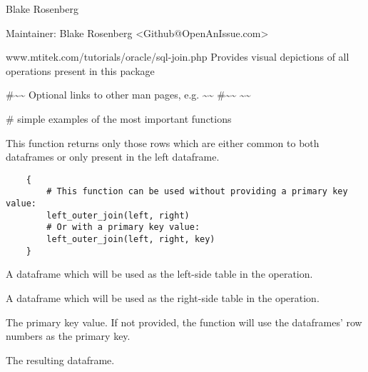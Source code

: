 \documentclass[a4paper]{book}
\begin{document}
%
\begin{Author}\relax
Blake Rosenberg

Maintainer: Blake Rosenberg <Github@OpenAnIssue.com>
\end{Author}
%
\begin{References}\relax
www.mtitek.com/tutorials/oracle/sql-join.php Provides visual depictions of all operations present in this package
\end{References}
%
\begin{SeeAlso}\relax
\#\textasciitilde{}\textasciitilde{} Optional links to other man pages, e.g. \textasciitilde{}\textasciitilde{}
\#\textasciitilde{}\textasciitilde{}  \textasciitilde{}\textasciitilde{}
\end{SeeAlso}
%
\begin{Examples}
\begin{ExampleCode}
# simple examples of the most important functions
\end{ExampleCode}
\end{Examples}
%
\begin{Description}\relax
This function returns only those rows which are either common to both dataframes or only present in the left dataframe.
\end{Description}
%
\begin{Usage}
\begin{verbatim}
    {
        # This function can be used without providing a primary key value:
        left_outer_join(left, right)
        # Or with a primary key value:
        left_outer_join(left, right, key)
    }
\end{verbatim}
\end{Usage}
%
\begin{Arguments}
\begin{ldescription}
\item[\code{left}] A dataframe which will be used as the left-side table in the operation.
\item[\code{right}] A dataframe which will be used as the right-side table in the operation.
\item[\code{key}] The primary key value. If not provided, the function will use the dataframes' row numbers as the primary key.
\end{ldescription}
\end{Arguments}
%
\begin{Value}
\begin{ldescription}
\item[\code{rtn}] The resulting dataframe.
\end{ldescription}
\end{Value}
\end{document}
